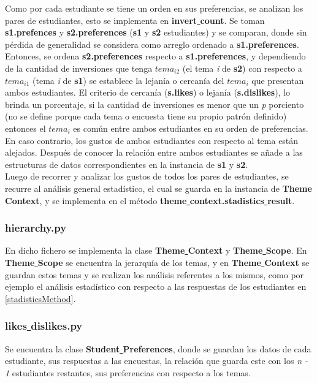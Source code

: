 \documentclass{book}
\begin{document}
				Como por cada estudiante se tiene un orden en sus preferencias, se analizan los pares de estudiantes, esto se implementa en \textbf{invert\underline{ }count}. Se toman \textbf{s1.prefences} y \textbf{s2.preferences} (\textbf{s1} y \textbf{s2} estudiantes) y se comparan, donde sin p\'erdida de generalidad se considera como arreglo ordenado a \textbf{s1.preferences}. Entonces, se ordena \textbf{s2.preferences} respecto a \textbf{s1.preferences}, y dependiendo de la cantidad de inversiones que tenga $tema_{i2}$ (el tema \textit{i} de \textbf{s2}) con respecto a $tema_{i1}$ (tema \textit{i} de \textbf{s1}) se establece la lejan\'ia o cercan\'ia del $tema_{i}$ que presentan ambos estudiantes. El criterio de cercan\'ia (\textbf{s.likes}) o lejan\'ia (\textbf{s.dislikes}), lo brinda un porcentaje, si la cantidad de inversiones es menor que un \textit{p} porciento (no se define porque cada tema o encuesta tiene su propio patr\'on definido) entonces el $tema_{i}$ es com\'un entre ambos estudiantes en su orden de preferencias. En caso contrario, los gustos de ambos estudiantes con respecto al tema est\'an alejados. Despu\'es de conocer la relaci\'on entre ambos estudiantes se a\~nade a las estructuras de datos correspondientes en la instancia de \textbf{s1} y \textbf{s2}. \\
				Luego de recorrer y analizar los gustos de todos los pares de estudiantes, se recurre al an\'alisis general estad\'istico, el cual se guarda en la instancia de \textbf{Theme\underline{ }Context},  y se implementa en el m\'etodo \textbf{theme\underline{ }context.stadistics\underline{ }result}. \label{stadisticsMethod}
			\subsubsection{hierarchy.py} \label{hierarchySec}
				En dicho fichero se implementa la clase \textbf{Theme\underline{ }Context} y \textbf{Theme\underline{ }Scope}. En \textbf{Theme\underline{ }Scope} se encuentra la jerarqu\'ia de los temas, y en \textbf{Theme\underline{ }Context} se guardan estos temas y se realizan los an\'alisis referentes a los mismos, como por ejemplo el an\'alisis estad\'istico con respecto a las respuestas de los estudiantes en \ref{stadisticsMethod}.
			\subsubsection{likes\underline{ }dislikes.py}
				Se encuentra la clase \textbf{Student\underline{ }Preferences}, donde se guardan los datos de cada estudiante, sus respuestas a las encuestas, la relaci\'on que guarda este con los \textit{n - 1} estudiantes restantes, sus preferencias con respecto a los temas.
\end{document}

